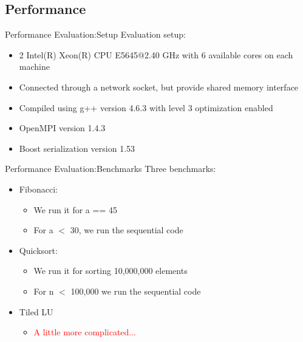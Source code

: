 \documentclass[svgnames]{beamer}
\begin{document}
\subsection{Performance}
\begin{frame}{Performance Evaluation:Setup}
Evaluation setup:
\begin{itemize}
	\item 2 Intel(R) Xeon(R) CPU E5645@2.40 GHz with 6 available cores on each machine
	\item Connected through a network socket, but provide shared memory interface
	\item Compiled using g++ version 4.6.3 with level 3 optimization enabled
	\item OpenMPI version 1.4.3
	\item Boost serialization version 1.53
\end{itemize}
\end{frame}
\begin{frame}{Performance Evaluation:Benchmarks}
Three benchmarks:
\vfill
\begin{itemize}
	\item Fibonacci:
	\begin{itemize}
		\item We run it for a == 45
		\item For a $<$ 30, we run the sequential code
	\end{itemize} 
\vfill
	\item Quicksort:
	\begin{itemize}
		\item We run it for sorting 10,000,000 elements
		\item For n $<$ 100,000 we run the sequential code
	\end{itemize}
\vfill
	\item Tiled LU
	\begin{itemize}
		\item<2-> \textcolor{red}{A little more complicated...}
	\end{itemize} 
\end{itemize}
\end{frame}
\end{document}
